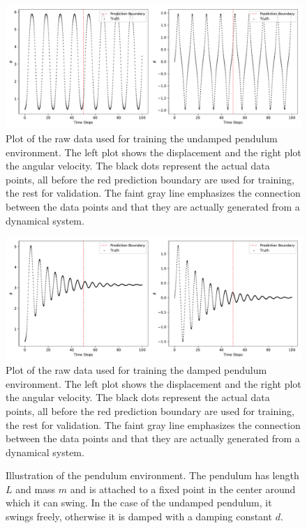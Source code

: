 			\begin{figure}
				\centering
				\includegraphics[width=\linewidth]{figures/experiments/environments/observations-pendulum-N0.pdf}
				\caption{Plot of the raw data used for training the undamped pendulum environment. The left plot shows the displacement and the right plot the angular velocity. The black dots represent the actual data points, all before the red prediction boundary are used for training, the rest for validation. The faint gray line emphasizes the connection between the data points and that they are actually generated from a dynamical system.}
				\label{fig:envPendulum}
			\end{figure}
			\begin{figure}
				\centering
				\includegraphics[width=\linewidth]{figures/experiments/environments/observations-pendulum-damped-N0.pdf}
				\caption{Plot of the raw data used for training the damped pendulum environment. The left plot shows the displacement and the right plot the angular velocity. The black dots represent the actual data points, all before the red prediction boundary are used for training, the rest for validation. The faint gray line emphasizes the connection between the data points and that they are actually generated from a dynamical system.}
				\label{fig:envPendulumDamped}
			\end{figure}

			\begin{figure}
				\centering
				\tikzSimplePendulum
				\caption{Illustration of the pendulum environment. The pendulum has length \(L\) and mass \(m\) and is attached to a fixed point in the center around which it can swing. In the case of the undamped pendulum, it swings freely, otherwise it is damped with a damping constant \(d\).}
				\label{fig:envPendulumSketch}
			\end{figure}

